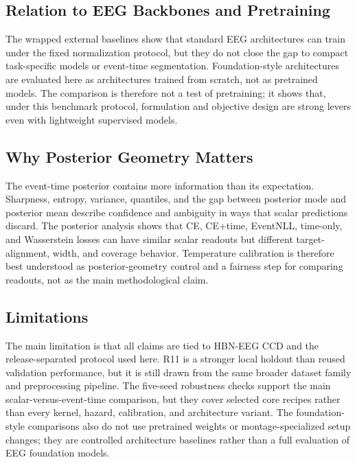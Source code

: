 \documentclass[12pt]{article}
\begin{document}
\subsection{Relation to EEG Backbones and Pretraining}

The wrapped external baselines show that standard EEG architectures can train under the fixed normalization protocol, but they do not close the gap to compact task-specific models or event-time segmentation. Foundation-style architectures are evaluated here as architectures trained from scratch, not as pretrained models. The comparison is therefore not a test of pretraining; it shows that, under this benchmark protocol, formulation and objective design are strong levers even with lightweight supervised models.

\subsection{Why Posterior Geometry Matters}

The event-time posterior contains more information than its expectation. Sharpness, entropy, variance, quantiles, and the gap between posterior mode and posterior mean describe confidence and ambiguity in ways that scalar predictions discard. The posterior analysis shows that CE, CE+time, EventNLL, time-only, and Wasserstein losses can have similar scalar readouts but different target-alignment, width, and coverage behavior. Temperature calibration is therefore best understood as posterior-geometry control and a fairness step for comparing readouts, not as the main methodological claim.

\subsection{Limitations}

The main limitation is that all claims are tied to HBN-EEG CCD and the release-separated protocol used here. R11 is a stronger local holdout than reused validation performance, but it is still drawn from the same broader dataset family and preprocessing pipeline. The five-seed robustness checks support the main scalar-versus-event-time comparison, but they cover selected core recipes rather than every kernel, hazard, calibration, and architecture variant. The foundation-style comparisons also do not use pretrained weights or montage-specialized setup changes; they are controlled architecture baselines rather than a full evaluation of EEG foundation models.
\end{document}
